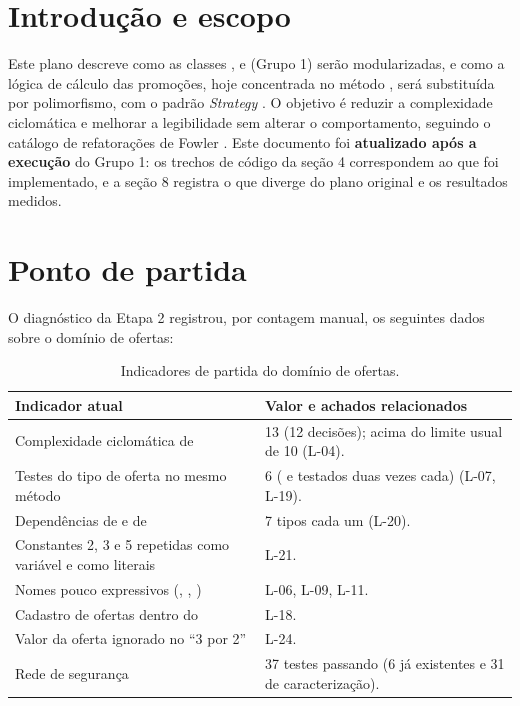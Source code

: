 

\tableofcontents\newpage

\section{Introdu\c{c}\~ao e escopo}
Este plano descreve como as classes ,  e  (Grupo 1) ser\~ao modularizadas, e como a l\'ogica de c\'alculo das promo\c{c}\~oes, hoje concentrada no m\'etodo , ser\'a substitu\'ida por polimorfismo, com o padr\~ao \textit{Strategy} \cite{gamma2000}. O objetivo \'e reduzir a complexidade ciclom\'atica e melhorar a legibilidade sem alterar o comportamento, seguindo o cat\'alogo de refatora\c{c}\~oes de Fowler \cite{fowler2020}. Este documento foi \textbf{atualizado ap\'os a execu\c{c}\~ao} do Grupo 1: os trechos de c\'odigo da se\c{c}\~ao 4 correspondem ao que foi implementado, e a se\c{c}\~ao 8 registra o que diverge do plano original e os resultados medidos.

\section{Ponto de partida}
O diagn\'ostico da Etapa 2 registrou, por contagem manual, os seguintes dados sobre o dom\'inio de ofertas:

\begin{table}[H]\centering\small
\begin{tabularx}{\textwidth}{>{\raggedright\arraybackslash}p{6.2cm}Y}
\toprule \textbf{Indicador atual} & \textbf{Valor e achados relacionados} \\ \midrule
Complexidade ciclom\'atica de  & 13 (12 decis\~oes); acima do limite usual de 10 (L-04). \\
Testes do tipo de oferta no mesmo m\'etodo & 6 ( e  testados duas vezes cada) (L-07, L-19). \\
Depend\^encias de  e de  & 7 tipos cada um (L-20). \\
Constantes 2, 3 e 5 repetidas como vari\'avel  e como literais & L-21. \\
Nomes pouco expressivos (, , ) & L-06, L-09, L-11. \\
Cadastro de ofertas dentro do  & L-18. \\
Valor da oferta ignorado no ``3 por 2'' & L-24. \\
Rede de seguran\c{c}a & 37 testes passando (6 j\'a existentes e 31 de caracteriza\c{c}\~ao). \\
\bottomrule\end{tabularx}
\caption{Indicadores de partida do dom\'inio de ofertas.}\end{table}

